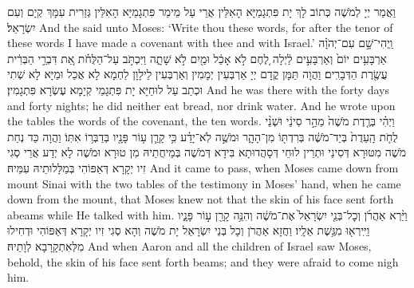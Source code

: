 {וַאֲמַר יְיָ לְמֹשֶׁה כְּתוֹב לָךְ יָת פִּתְגָמַיָּא הָאִלֵּין אֲרֵי עַל מֵימַר פִּתְגָמַיָּא הָאִלֵּין גְּזַרִית עִמָּךְ קְיָם וְעִם יִשְׂרָאֵל׃}
{And the \lord\space said unto Moses: ‘Write thou these words, for after the tenor of these words I have made a covenant with thee and with Israel.’}{}
{וַֽיְהִי־שָׁ֣ם עִם־יְהֹוָ֗ה אַרְבָּעִ֥ים יוֹם֙ וְאַרְבָּעִ֣ים לַ֔יְלָה לֶ֚חֶם לֹ֣א אָכַ֔ל וּמַ֖יִם לֹ֣א שָׁתָ֑ה וַיִּכְתֹּ֣ב עַל־הַלֻּחֹ֗ת אֵ֚ת דִּבְרֵ֣י הַבְּרִ֔ית עֲשֶׂ֖רֶת הַדְּבָרִֽים׃}
{וַהֲוָה תַּמָּן קֳדָם יְיָ אַרְבְּעִין יְמָמִין וְאַרְבְּעִין לֵילָוָן לַחְמָא לָא אֲכַל וּמַיָּא לָא שְׁתִי וּכְתַב עַל לוּחַיָּא יָת פִּתְגָמֵי קְיָמָא עֶשְׂרָא פִּתְגָמִין׃}
{And he was there with the \lord\space forty days and forty nights; he did neither eat bread, nor drink water. And he wrote upon the tables the words of the covenant, the ten words.}{}
{וַיְהִ֗י בְּרֶ֤דֶת מֹשֶׁה֙ מֵהַ֣ר סִינַ֔י וּשְׁנֵ֨י לֻחֹ֤ת הָֽעֵדֻת֙ בְּיַד־מֹשֶׁ֔ה בְּרִדְתּ֖וֹ מִן־הָהָ֑ר וּמֹשֶׁ֣ה לֹֽא־יָדַ֗ע כִּ֥י קָרַ֛ן ע֥וֹר פָּנָ֖יו בְּדַבְּר֥וֹ אִתּֽוֹ׃
}
{וַהֲוָה כַּד נְחַת מֹשֶׁה מִטּוּרָא דְּסִינַי וּתְרֵין לוּחֵי דְּסָהֲדוּתָא בִּידָא דְּמֹשֶׁה בְּמֵיחֲתֵיהּ מִן טוּרָא וּמֹשֶׁה לָא יְדַע אֲרֵי סְגִי זִיו יְקָרָא דְּאַפּוֹהִי בְּמַלָּלוּתֵיהּ עִמֵּיהּ׃}
{And it came to pass, when Moses came down from mount Sinai with the two tables of the testimony in Moses’ hand, when he came down from the mount, that Moses knew not that the skin of his face sent forth abeams while He talked with him.}{}
{וַיַּ֨רְא אַהֲרֹ֜ן וְכׇל־בְּנֵ֤י יִשְׂרָאֵל֙ אֶת־מֹשֶׁ֔ה וְהִנֵּ֥ה קָרַ֖ן ע֣וֹר פָּנָ֑יו וַיִּֽירְא֖וּ מִגֶּ֥שֶׁת אֵלָֽיו׃
}
{וַחֲזָא אַהֲרֹן וְכָל בְּנֵי יִשְׂרָאֵל יָת מֹשֶׁה וְהָא סְגִי זִיו יְקָרָא דְּאַפּוֹהִי וּדְחִילוּ מִלְּאִתְקָרָבָא לְוָתֵיהּ׃}
{And when Aaron and all the children of Israel saw Moses, behold, the skin of his face sent forth beams; and they were afraid to come nigh him.}{}
